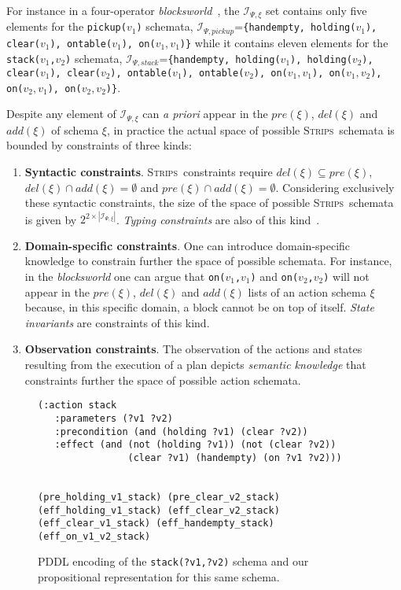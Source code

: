 \documentclass{article}
\newcommand{\strips}{\textsc{Strips}}
\begin{document}
For instance in a four-operator {\em blocksworld}~\cite{slaney2001blocks}, the ${\mathcal I}_{\Psi,\xi}$ set contains only five elements for the {\small \tt pickup($v_1$)} schemata, ${\mathcal I}_{\Psi,pickup}$={\small\tt\{handempty, holding($v_1$), clear($v_1$), ontable($v_1$), on($v_1,v_1$)\}} while it contains eleven elements for the {\small \tt stack($v_1$,$v_2$)} schemata, ${\mathcal I}_{\Psi,stack}$={\small\tt\{handempty, holding($v_1$), holding($v_2$), clear($v_1$), clear($v_2$), ontable($v_1$), ontable($v_2$), on($v_1,v_1$), on($v_1,v_2$), on($v_2,v_1$), on($v_2,v_2$)\}}. 

Despite any element of ${\mathcal I}_{\Psi,\xi}$ can {\em a priori} appear in the $pre(\xi)$, $del(\xi)$ and $add(\xi)$ of schema $\xi$, in practice the actual space of possible \strips\ schemata is bounded by constraints of three kinds:
\begin{enumerate}
\item {\bf Syntactic constraints}. \strips\ constraints require $del(\xi)\subseteq pre(\xi)$, $del(\xi)\cap add(\xi)=\emptyset$ and $pre(\xi)\cap add(\xi)=\emptyset$. Considering exclusively these syntactic constraints, the size of the space of possible \strips\ schemata is given by $2^{2\times|{\mathcal I}_{\Psi,\xi}|}$. {\em Typing constraints} are also of this kind~\cite{mcdermott1998pddl}. 
\item {\bf Domain-specific constraints}. One can introduce domain-specific knowledge to constrain further the space of possible schemata. For instance, in the {\em blocksworld} one can argue that {\small\tt on($v_1$,$v_1$)} and {\small\tt on($v_2$,$v_2$)} will not appear in the $pre(\xi)$, $del(\xi)$ and $add(\xi)$ lists of an action schema $\xi$ because, in this specific domain, a block cannot be on top of itself. {\it State invariants} are constraints of this kind. 
\item {\bf Observation constraints}. The observation of the actions and states resulting from the execution of a plan depicts {\em semantic knowledge} that constraints further the space of possible action schemata.   
\end{enumerate}

\begin{figure}
  \begin{tiny}  
  \begin{verbatim}
(:action stack
   :parameters (?v1 ?v2)
   :precondition (and (holding ?v1) (clear ?v2))
   :effect (and (not (holding ?v1)) (not (clear ?v2))
                (clear ?v1) (handempty) (on ?v1 ?v2)))


(pre_holding_v1_stack) (pre_clear_v2_stack)
(eff_holding_v1_stack) (eff_clear_v2_stack)
(eff_clear_v1_stack) (eff_handempty_stack) (eff_on_v1_v2_stack)
  \end{verbatim}           
  \end{tiny}  
 \caption{\small PDDL encoding of the {\tt\small stack(?v1,?v2)} schema and our propositional representation for this same schema.}
\label{fig:propositional}
\end{figure}
\end{document}

